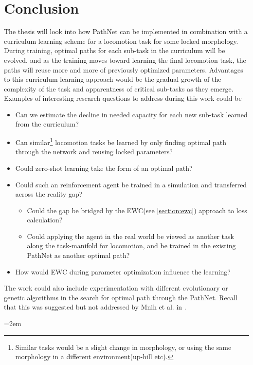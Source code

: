 \documentclass[a4paper,english]{report}
\begin{document}
\chapter{Conclusion}
The thesis will look into how PathNet can be implemented in combination with a curriculum learning scheme for a locomotion task for some locked morphology. During training, optimal paths for each sub-task in the curriculum will be evolved, and as the training moves toward learning the final locomotion task, the paths will reuse more and more of previously optimized parameters. Advantages to this curriculum learning approach would be the gradual growth of the complexity of the task and apparentness of critical sub-tasks as they emerge.  
\newline\newline
Examples of interesting research questions to address during this work could be 
\begin{itemize}
\item Can we estimate the decline in needed capacity for each new sub-task learned from the curriculum?
\item Can similar\footnote{Similar tasks would be a slight change in morphology, or using the same morphology in a different environment(up-hill etc).} locomotion tasks be learned by only finding optimal path through the network and reusing locked parameters?
\item Could zero-shot learning take the form of an optimal path? 
\item Could such an reinforcement agent be trained in a simulation and transferred across the reality gap?
    \begin{itemize}
    \item Could the gap be bridged by the EWC(see \ref{section:ewc}) approach to loss calculation?
    \item Could applying the agent in the real world be viewed as another task along the task-manifold for locomotion, and be trained in the existing PathNet as another optimal path? 
    \end{itemize}
\item How would EWC during parameter optimization influence the learning?
\end{itemize}
The work could also include experimentation with different evolutionary or genetic algorithms in the search for optimal path through the PathNet. Recall that this was suggested but not addressed by Mnih et al. in \cite{pathnet}.



\newpage
\emergencystretch=2em
\printbibliography
\end{document}
